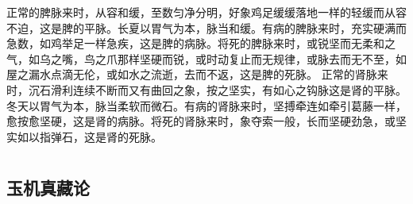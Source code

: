 \documentclass[a4paper,12pt,UTF8,twoside]{ctexbook}
\begin{document}
正常的脾脉来时，从容和缓，至数匀净分明，好象鸡足缓缓落地一样的轻缓而从容不迫，这是脾的平脉。长夏以胃气为本，脉当和缓。有病的脾脉来时，充实硬满而急数，如鸡举足一样急疾，这是脾的病脉。将死的脾脉来时，或锐坚而无柔和之气，如乌之嘴，鸟之爪那样坚硬而锐，或时动复止而无规律，或脉去而无不至，如屋之漏水点滴无伦，或如水之流逝，去而不返，这是脾的死脉。
正常的肾脉来时，沉石滑利连续不断而又有曲回之象，按之坚实，有如心之钩脉这是肾的平脉。冬天以胃气为本，脉当柔软而微石。有病的肾脉来时，坚搏牵连如牵引葛藤一样，愈按愈坚硬，这是肾的病脉。将死的肾脉来时，象夺索一般，长而坚硬劲急，或坚实如以指弹石，这是肾的死脉。

\part{}

\chapter{玉机真藏论}
\end{document}
